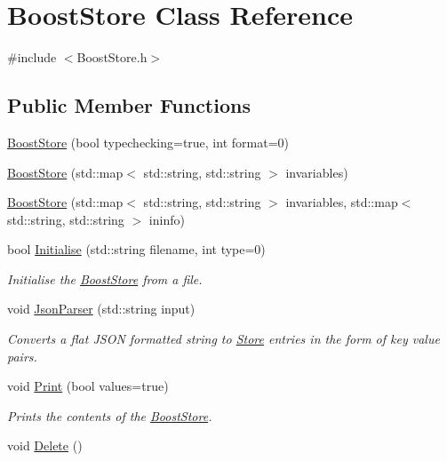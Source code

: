 \hypertarget{classBoostStore}{\section{Boost\-Store Class Reference}
\label{classBoostStore}
}


{\ttfamily \#include $<$Boost\-Store.\-h$>$}

\subsection*{Public Member Functions}
\begin{DoxyCompactItemize}
\item 
\hyperlink{classBoostStore_af359015c3ca44cd24fd915ec7bb008b4}{Boost\-Store} (bool typechecking=true, int format=0)
\item 
\hyperlink{classBoostStore_af114bcb7df59af05e5715af756771379}{Boost\-Store} (std\-::map$<$ std\-::string, std\-::string $>$ invariables)
\item 
\hyperlink{classBoostStore_a57b996f894624e61e8f57bf495f00c07}{Boost\-Store} (std\-::map$<$ std\-::string, std\-::string $>$ invariables, std\-::map$<$ std\-::string, std\-::string $>$ ininfo)
\item 
bool \hyperlink{classBoostStore_ada96e21cf2ffd6872dd1523ac6a5316b}{Initialise} (std\-::string filename, int type=0)
\begin{DoxyCompactList}\small\item\em Initialise the \hyperlink{classBoostStore}{Boost\-Store} from a file. \end{DoxyCompactList}\item 
void \hyperlink{classBoostStore_a6380dcf800764516378adc5552f63114}{Json\-Parser} (std\-::string input)
\begin{DoxyCompactList}\small\item\em Converts a flat J\-S\-O\-N formatted string to \hyperlink{classStore}{Store} entries in the form of key value pairs. \end{DoxyCompactList}\item 
void \hyperlink{classBoostStore_ac88d4b1cd17889c85d4acfca3a2b2acc}{Print} (bool values=true)
\begin{DoxyCompactList}\small\item\em Prints the contents of the \hyperlink{classBoostStore}{Boost\-Store}. \end{DoxyCompactList}\item 
\hypertarget{classBoostStore_a99c755b996ad99c9d610dd48ffb78f17}{void \hyperlink{classBoostStore_a99c755b996ad99c9d610dd48ffb78f17}{Delete} ()}\label{classBoostStore_a99c755b996ad99c9d610dd48ffb78f17}


\end{DoxyCompactItemize}
